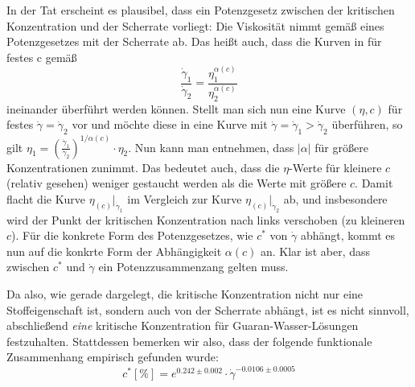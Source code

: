 \documentclass[11pt,a4paper,oneside]{scrartcl}
\begin{document}
In der Tat erscheint es plausibel, dass ein Potenzgesetz zwischen der kritischen Konzentration und der Scherrate vorliegt: Die Viskosität nimmt gemäß eines Potenzgesetzes mit der Scherrate ab. 
Das heißt auch, dass die Kurven in  für festes c gemäß \begin{equation}
\frac{\dot\gamma_1}{\dot\gamma_2}=\frac{\eta_1^{\alpha(c)}}{\eta_2^{\alpha(c)}}
\end{equation}
ineinander überführt werden können. Stellt man sich nun eine Kurve $(\eta,c)$ für festes $\dot\gamma=\dot\gamma_2$ vor und möchte diese in eine Kurve mit $\dot\gamma=\dot\gamma_1>\dot\gamma_2$ überführen, so gilt $\eta_1=\left(\frac{\dot\gamma_1}{\dot\gamma_2}\right)^{1/\alpha(c)}\cdot\eta_2$. Nun kann man  entnehmen, dass $|\alpha|$ für größere Konzentrationen zunimmt. Das bedeutet auch, dass die $\eta$-Werte für kleinere $c$ (relativ gesehen) weniger gestaucht werden als die Werte mit größere $c$. Damit flacht die Kurve $\eta_(c)\big|_{\dot\gamma_1}$ im Vergleich zur Kurve 
$\eta_(c)\big|_{\dot\gamma_2}$ ab, und insbesondere wird der Punkt der kritischen Konzentration nach links verschoben (zu kleineren $c$). Für die konkrete Form des Potenzgesetzes, wie $c^*$ von $\dot\gamma$ abhängt, kommt es nun auf die konkrte Form der Abhängigkeit $\alpha(c)$ an. Klar ist aber, dass zwischen $c^*$ und $\dot\gamma$ ein Potenzzusammenzang gelten muss.\par
Da also, wie gerade dargelegt, die kritische Konzentration nicht nur eine Stoffeigenschaft ist, sondern auch von der Scherrate abhängt, ist es nicht sinnvoll, abschließend \emph{eine} kritische Konzentration für Guaran-Wasser-Lösungen festzuhalten. Stattdessen bemerken wir also, dass der folgende funktionale Zusammenhang empirisch gefunden wurde:
\begin{equation}
c^*[\%]=e^{0.242\pm0.002}\cdot\dot\gamma^{-0.0106\pm0.0005}
\end{equation}


\end{document}
